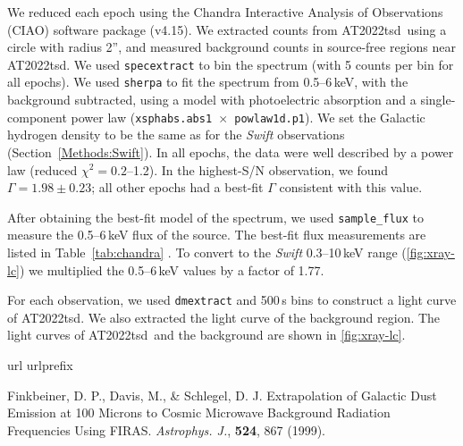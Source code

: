 \documentclass{nature_plusfigure}
\newcommand{\apj}{{Astrophys. J.}}
\newcommand{\at}{AT2022tsd}
\begin{document}
\begin{methods}
We reduced each epoch using the Chandra Interactive Analysis of Observations (CIAO\cite{Fruscione2006}) software package (v4.15). We extracted counts from \at\ using a circle with radius 2'', and measured background counts in source-free regions near \at.
We used \texttt{specextract} to bin the spectrum (with 5 counts per bin for all epochs). We used \texttt{sherpa} to fit the spectrum from 0.5--6\,keV, with the background subtracted, using a model with photoelectric absorption and a single-component power law (\texttt{xsphabs.abs1 $\times$ powlaw1d.p1}). We set the Galactic hydrogen density to be the same as for the \emph{Swift} observations (Section~\ref{Methods:Swift}). In all epochs, the data were well described by a power law (reduced $\chi^2=0.2$--1.2). In the highest-S/N observation, we found $\Gamma=1.98\pm0.23$; all other epochs had a best-fit $\Gamma$ consistent with this value.

After obtaining the best-fit model of the spectrum, we used \texttt{sample\_flux} to measure the 0.5--6\,keV flux of the source. The best-fit flux measurements are listed in Table~\ref{tab:chandra} . To convert to the \emph{Swift} 0.3--10\,keV range (\ref{fig:xray-lc}) we multiplied the 0.5--6\,keV values by a factor of 1.77.

For each observation, we used \texttt{dmextract} and 500\,s bins to construct a light curve of \at. We also extracted the light curve of the background region. The light curves of \at\ and the background are shown in \ref{fig:xray-lc}. 

\vspace{1in}
%
%

\begin{thebibliography}{10}
\expandafter\ifx\csname url\endcsname\relax
  \def\url#1{\texttt{#1}}\fi
\expandafter\ifx\csname urlprefix\endcsname\relax\def\urlprefix{URL }\fi
\providecommand{\bibinfo}[2]{#2}
\providecommand{\eprint}[2][]{\url{#2}}
\makeatletter
\addtocounter{\@listctr}{37}
\makeatother


  Finkbeiner, D. P., Davis, M., \& Schlegel, D. J. Extrapolation of Galactic Dust Emission at 100 Microns to Cosmic Microwave Background Radiation Frequencies Using FIRAS. \emph{\apj}, \textbf{524}, 867 (1999). 
 

\end{thebibliography}
\end{methods}
\end{document}
